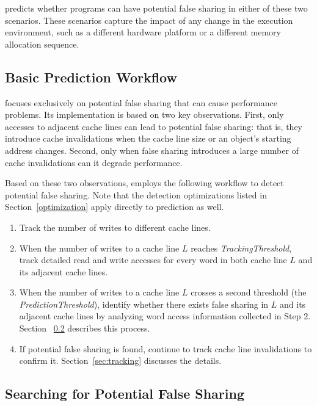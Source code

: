 \Predator{} predicts whether programs can have potential false sharing  
in either of these two scenarios. These scenarios capture the impact of any change in the execution environment, such as a different hardware platform or a different memory allocation sequence.

\subsection{Basic Prediction Workflow}
\label{sec:predictionmechanism} 

\Predator{} focuses exclusively on potential false sharing that can 
cause performance problems.
Its implementation is based on
two key observations. First, only accesses to 
adjacent cache lines can lead to potential false sharing: 
that is, they introduce cache invalidations when the cache line size
or an object's starting address changes.
Second, only when false sharing introduces a large number of cache invalidations
can it degrade performance.

Based on these two observations, \Predator{} employs 
the following workflow to detect potential false sharing.
Note that the detection optimizations listed in Section~\ref{optimization} apply directly to prediction as well.

\begin{enumerate}
\item
Track the number of writes to different cache lines. 

\item
When the number of writes to a cache line $L$ reaches {\it TrackingThreshold},
track detailed read and write accesses for every word in both cache line $L$ 
and its adjacent cache lines. 

\item
When the number of writes to a cache line $L$ crosses a second threshold (the 
{\it PredictionThreshold}), 
identify whether there exists false sharing in $L$ and its adjacent 
cache lines by analyzing word access information collected in Step 2. 
Section ~\ref{sec:evaluatingfs} describes this process.

\item
If potential false sharing is found, continue to track cache line invalidations to confirm it. Section~\ref{sec:tracking} discusses the details.
 
\end{enumerate}

\subsection{Searching for Potential False Sharing}
\label{sec:evaluatingfs}

